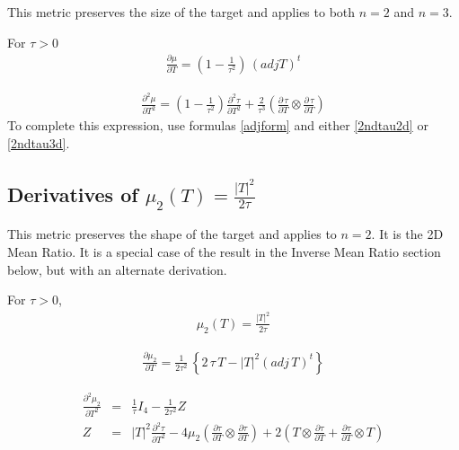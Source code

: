 \documentclass{report}
\begin{document}
\noindent This metric preserves the size of the target and applies
to both $n=2$ and $n=3$. \newline

\noindent For $\tau>0$
\begin{eqnarray}
\frac{\partial \mu}{\partial T} = \left( 1 - \frac{1}{\tau^2} \right) \, (adj T)^t
\end{eqnarray}

\begin{eqnarray}
\frac{\partial^2 \mu}{\partial T^2} = \left( 1 - \frac{1}{\tau^2} \right) \frac{\partial^2 \tau}{\partial T^2} + \frac{2}{\tau^3} \left( \frac{\partial \, \tau}{\partial T} \otimes \frac{\partial \, \tau}{\partial T} \right)
\end{eqnarray}
To complete this expression, use formulas \ref{adjform} and either 
\ref{2ndtau2d} or \ref{2ndtau3d}. \newline

\subsection{Derivatives of $\mu_2(T) = \frac{|T|^2}{2 \tau}$}

\noindent This metric preserves the shape of the target and applies
to $n=2$. It is the 2D Mean Ratio. It is a special case of the result
in the Inverse Mean Ratio section below, but with an alternate derivation. \newline

\noindent For $\tau>0$,
\begin{eqnarray}
\mu_2(T) = \frac{|T|^2}{2 \tau}
\end{eqnarray}

\begin{eqnarray}
\frac{\partial \mu_2}{\partial T} = \frac{1}{2 \tau^2} \, \left\{ 2 \, \tau \, T - |T|^2 (adj \, T)^t \right\}
\end{eqnarray}

\begin{eqnarray}
\frac{\partial^2 \mu_2}{\partial T^2} & = & \frac{1}{\tau} I_4 - \frac{1}{2 \tau^2} Z \\
Z & = & |T|^2 \frac{\partial^2 \tau}{\partial T^2} - 4 \mu_2 \left(\frac{\partial \tau}{\partial T} \otimes \frac{\partial \tau}{\partial T} \right) + 2 \left( T \otimes \frac{\partial \tau}{\partial T} + \frac{\partial \tau}{\partial T} \otimes T \right) \nonumber \\
\end{eqnarray}
\end{document}

